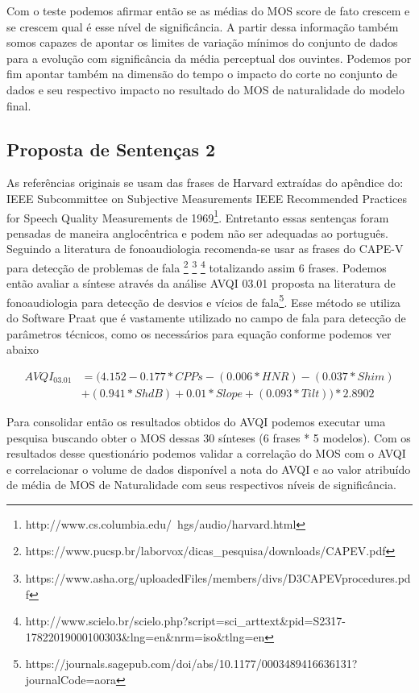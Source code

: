 \documentclass{article}
\begin{document}
Com o teste podemos afirmar então se as médias do MOS score de fato crescem e se crescem qual é esse nível de significância. A partir dessa informação também somos capazes de apontar os limites de variação mínimos do conjunto de dados para a evolução com significância da média perceptual dos ouvintes. Podemos por fim apontar também na dimensão do tempo o impacto do corte no conjunto de dados e seu respectivo impacto no resultado do MOS de naturalidade do modelo final.

\subsection{Proposta de Sentenças 2}
As referências originais se usam das frases de Harvard extraídas do apêndice do: IEEE Subcommittee on Subjective Measurements IEEE Recommended Practices for Speech Quality Measurements de 1969\footnote{http://www.cs.columbia.edu/~hgs/audio/harvard.html}. Entretanto essas sentenças foram pensadas de maneira anglocêntrica e podem não ser adequadas ao português. Seguindo a literatura de fonoaudiologia recomenda-se usar as frases do CAPE-V para detecção de problemas de fala \footnote{https://www.pucsp.br/laborvox/dicas\_pesquisa/downloads/CAPEV.pdf}  \footnote{https://www.asha.org/uploadedFiles/members/divs/D3CAPEVprocedures.pdf} \footnote{http://www.scielo.br/scielo.php?script=sci\_arttext\&pid=S2317-17822019000100303\&lng=en\&nrm=iso\&tlng=en} totalizando assim 6 frases. Podemos então avaliar a síntese através da análise AVQI 03.01 proposta na literatura de fonoaudiologia para detecção de desvios e vícios de fala\footnote{https://journals.sagepub.com/doi/abs/10.1177/0003489416636131?journalCode=aora}. Esse método se utiliza do Software Praat que é vastamente utilizado no campo de fala para detecção de parâmetros técnicos, como os necessários para equação conforme podemos ver abaixo

\begin{equation}
	\begin{split}
    	AVQI_{03.01}& = (4.152 - 0.177*CPPs - (0.006*HNR) - (0.037*Shim)\\ 
    	&+ (0.941*ShdB) + 0.01*Slope + (0.093*Tilt))*2.8902
	\end{split}
\end{equation}

Para consolidar então os resultados obtidos do AVQI podemos executar uma pesquisa buscando obter o MOS dessas 30 sínteses (6 frases * 5 modelos). Com os resultados desse questionário podemos validar a correlação do MOS com o AVQI e correlacionar o volume de dados disponível a nota do AVQI e ao valor atribuído de média de MOS de Naturalidade com seus respectivos níveis de significância.

  
  
\end{document}
